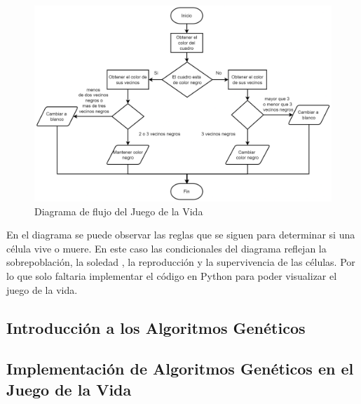 \begin{figure}[H]
    \centering
    \includegraphics[width=0.9\linewidth]{IMA/DiagramaFlujoJuegoLaVida.png} 
    \caption{Diagrama de flujo del Juego de la Vida} 
\end{figure}

En el diagrama se puede observar las reglas que se siguen para determinar si una célula vive o muere.
En este caso las condicionales del diagrama reflejan la sobrepoblación, la soledad , la reproducción y la supervivencia de las células.
Por lo que solo faltaria implementar el código en Python para poder visualizar el juego de la vida.


\subsection{Introducción a los Algoritmos Genéticos}




\subsection{Implementación de Algoritmos Genéticos en el Juego de la Vida}
